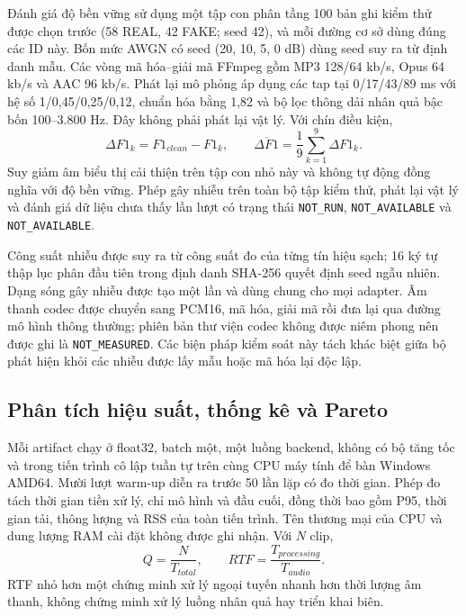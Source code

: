 \documentclass[10pt,journal,onecolumn,a4paper]{IEEEtran}
\begin{document}
Đánh giá độ bền vững sử dụng một tập con phân tầng 100 bản ghi kiểm thử được chọn trước (58 REAL, 42 FAKE; seed 42), và mỗi đường cơ sở dùng đúng các ID này. Bốn mức AWGN có seed (20, 10, 5, 0 dB) dùng seed suy ra từ định danh mẫu. Các vòng mã hóa--giải mã FFmpeg gồm MP3 128/64 kb/s, Opus 64 kb/s và AAC 96 kb/s. Phát lại mô phỏng áp dụng các tap tại 0/17/43/89 ms với hệ số 1/0,45/0,25/0,12, chuẩn hóa bằng 1,82 và bộ lọc thông dải nhân quả bậc bốn 100--3.800 Hz. Đây không phải phát lại vật lý. Với chín điều kiện,
\begin{equation}
\Delta F1_k=F1_{clean}-F1_k,\qquad \overline{\Delta F1}=\frac{1}{9}\sum_{k=1}^{9}\Delta F1_k.
\label{eq:degradation}
\end{equation}
Suy giảm âm biểu thị cải thiện trên tập con nhỏ này và không tự động đồng nghĩa với độ bền vững. Phép gây nhiễu trên toàn bộ tập kiểm thử, phát lại vật lý và đánh giá dữ liệu chưa thấy lần lượt có trạng thái \texttt{NOT\_RUN}, \texttt{NOT\_AVAILABLE} và \texttt{NOT\_AVAILABLE}.

Công suất nhiễu được suy ra từ công suất đo của từng tín hiệu sạch; 16 ký tự thập lục phân đầu tiên trong định danh SHA-256 quyết định seed ngẫu nhiên. Dạng sóng gây nhiễu được tạo một lần và dùng chung cho mọi adapter. Âm thanh codec được chuyển sang PCM16, mã hóa, giải mã rồi đưa lại qua đường mô hình thông thường; phiên bản thư viện codec không được niêm phong nên được ghi là \texttt{NOT\_MEASURED}. Các biện pháp kiểm soát này tách khác biệt giữa bộ phát hiện khỏi các nhiễu được lấy mẫu hoặc mã hóa lại độc lập.

\subsection{Phân tích hiệu suất, thống kê và Pareto}
Mỗi artifact chạy ở float32, batch một, một luồng backend, không có bộ tăng tốc và trong tiến trình cô lập tuần tự trên cùng CPU máy tính để bàn Windows AMD64. Mười lượt warm-up diễn ra trước 50 lần lặp có đo thời gian. Phép đo tách thời gian tiền xử lý, chỉ mô hình và đầu cuối, đồng thời bao gồm P95, thời gian tải, thông lượng và RSS của toàn tiến trình. Tên thương mại của CPU và dung lượng RAM cài đặt không được ghi nhận. Với $N$ clip,
\begin{equation}
Q=\frac{N}{T_{total}},\qquad RTF=\frac{T_{processing}}{T_{audio}}.
\label{eq:efficiency}
\end{equation}
RTF nhỏ hơn một chứng minh xử lý ngoại tuyến nhanh hơn thời lượng âm thanh, không chứng minh xử lý luồng nhân quả hay triển khai biên.
\end{document}

